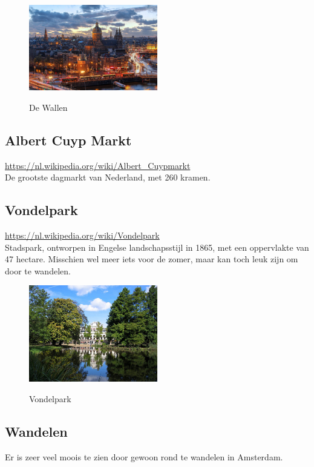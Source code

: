 \documentclass[a4paper, 12pt]{article}
\begin{document}
\begin{figure}[h]
    \centering
    \includegraphics[width=0.5\textwidth]{red-light-district-amsterdam.jpg}\label{fig:wallen}
    \caption{De Wallen}
\end{figure}

\subsection{Albert Cuyp Markt}
\url{https://nl.wikipedia.org/wiki/Albert_Cuypmarkt}\\
De grootste dagmarkt van Nederland, met 260 kramen.

\subsection{Vondelpark}
\url{https://nl.wikipedia.org/wiki/Vondelpark}\\
Stadspark, ontworpen in Engelse landschapsstijl in 1865, met een oppervlakte van 47 hectare.
Misschien wel meer iets voor de zomer, maar kan toch leuk zijn om door te wandelen.

\begin{figure}[h]
    \centering
    \includegraphics[width=0.5\textwidth]{vondelpark.jpg}\label{fig:vondelpark}
    \caption{Vondelpark}
\end{figure}

\subsection{Wandelen}
Er is zeer veel moois te zien door gewoon rond te wandelen in Amsterdam.
\end{document}

